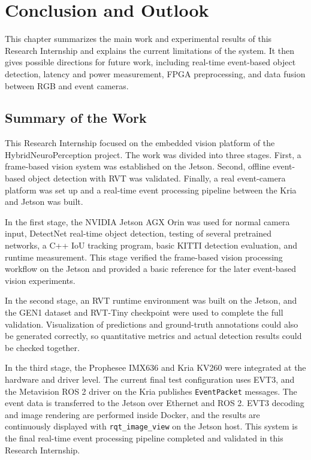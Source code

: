 \chapter{Conclusion and Outlook}

This chapter summarizes the main work and experimental results of this Research Internship and explains the current limitations of the system. It then gives possible directions for future work, including real-time event-based object detection, latency and power measurement, FPGA preprocessing, and data fusion between RGB and event cameras.

\section{Summary of the Work}

This Research Internship focused on the embedded vision platform of the HybridNeuroPerception project. The work was divided into three stages. First, a frame-based vision system was established on the Jetson. Second, offline event-based object detection with RVT was validated. Finally, a real event-camera platform was set up and a real-time event processing pipeline between the Kria and Jetson was built.

In the first stage, the NVIDIA Jetson AGX Orin was used for normal camera input, DetectNet real-time object detection, testing of several pretrained networks, a C++ IoU tracking program, basic KITTI detection evaluation, and runtime measurement. This stage verified the frame-based vision processing workflow on the Jetson and provided a basic reference for the later event-based vision experiments.

In the second stage, an RVT runtime environment was built on the Jetson, and the GEN1 dataset and RVT-Tiny checkpoint were used to complete the full validation. Visualization of predictions and ground-truth annotations could also be generated correctly, so quantitative metrics and actual detection results could be checked together.

In the third stage, the Prophesee IMX636 and Kria KV260 were integrated at the hardware and driver level. The current final test configuration uses EVT3, and the Metavision ROS 2 driver on the Kria publishes \texttt{EventPacket} messages. The event data is transferred to the Jetson over Ethernet and ROS 2. EVT3 decoding and image rendering are performed inside Docker, and the results are continuously displayed with \texttt{rqt\_image\_view} on the Jetson host. This system is the final real-time event processing pipeline completed and validated in this Research Internship.

